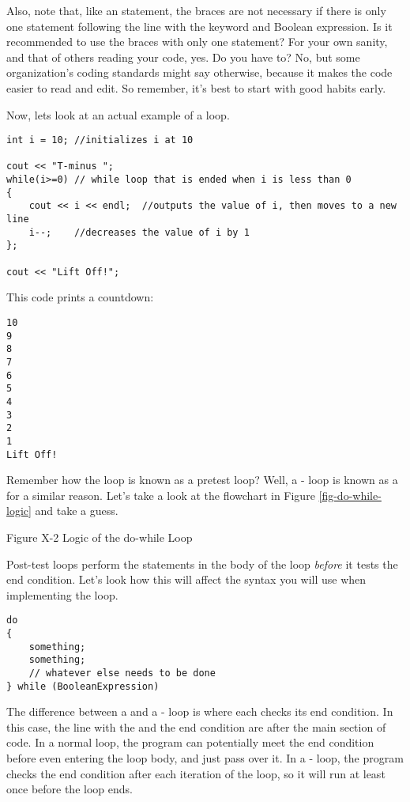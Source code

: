 Also, note that, like an  statement, the braces are not necessary if there is only one statement following the line with the  keyword and Boolean expression.
Is it recommended to use the braces with only one statement?
For your own sanity, and that of others reading your code, yes.
Do you have to?
No, but some organization's coding standards might say otherwise, because it makes the code easier to read and edit.
So remember, it's best to start with good habits early.

Now, lets look at an actual example of a  loop.

\begin{lstlisting}
int i = 10;	//initializes i at 10

cout << "T-minus ";
while(i>=0)	// while loop that is ended when i is less than 0
{
	cout << i << endl;	//outputs the value of i, then moves to a new line
	i--;	//decreases the value of i by 1
};

cout << "Lift Off!";
\end{lstlisting}

This code prints a countdown:

\begin{lstlisting}
10
9
8
7
6
5
4
3
2
1
Lift Off!
\end{lstlisting}



Remember how the  loop is known as a pretest loop?
Well, a - loop is known as a  for a similar reason.
Let's take a look at the flowchart in Figure \ref{fig-do-while-logic} and take a guess.

Figure X-2 Logic of the do-while Loop
\label{fig-do-while-logic}

Post-test loops perform the statements in the body of the loop \emph{before} it tests the end condition.
Let's look how this will affect the syntax you will use when implementing the loop.

\begin{lstlisting}
do
{
	something;
	something;
	// whatever else needs to be done
} while (BooleanExpression)
\end{lstlisting}

The difference between a  and a - loop is where each checks its end condition.
In this case, the line with the  and the end condition are after the main section of code.
In a normal  loop, the program can potentially meet the end condition before even entering the loop body, and just pass over it.
In a - loop, the program checks the end condition after each iteration of the loop, so it will run at least once before the loop ends.

